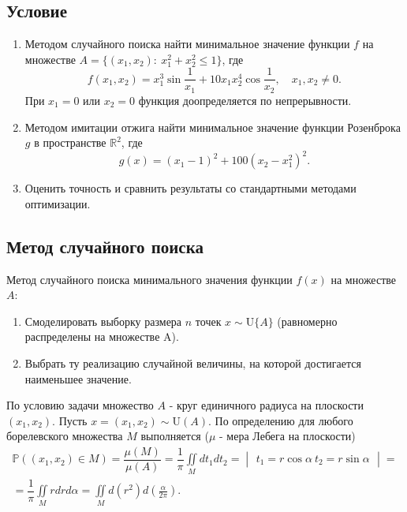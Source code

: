 \documentclass[11pt]{report}
\begin{document}
\subsection{Условие}

\begin{enumerate}
\item Методом случайного поиска найти минимальное значение функции $f$ на множестве $A = \{(x_1,x_2):~x_1^2+x_2^2\leqslant 1\}$, где
\begin{equation}\label{func7}
f(x_1,x_2) = x_1^3\sin\frac{1}{x_1} + 10x_1x_2^4\cos\frac{1}{x_2},\quad x_1,x_2\neq0.
\end{equation}
При $x_1=0$ или $x_2=0$ функция доопределяется по непрерывности.

\item Методом имитации отжига найти минимальное значение функции Розенброка $g$ в пространстве $\mathbb{R}^2$, где
$$
g(x) = (x_1-1)^2 + 100(x_2-x_1^2)^2.
$$

\item Оценить точность и сравнить результаты со стандартными методами оптимизации.
\end{enumerate}

\subsection{Метод случайного поиска}

Метод случайного поиска минимального значения функции $f(x)$ на множестве $A$:
\begin{enumerate}
\item Смоделировать выборку размера $n$ точек $x\sim\mathrm{U}\{A\}$ (равномерно распределены на множестве A).
\item Выбрать ту реализацию случайной величины, на которой достигается наименьшее значение.
\end{enumerate}

По условию задачи множество $A$ - круг единичного радиуса на плоскости $(x_1,x_2)$. Пусть $x=(x_1,x_2)\sim\mathrm{U}(A)$. По определению для любого борелевского множества $M$ выполняется ($\mu$ - мера Лебега на плоскости)
\begin{multline*}
\mathbb{P}\left( (x_1,x_2)\in M \right) = \dfrac{\mu (M)}{\mu (A)} = \dfrac{1}{\pi}\iint\limits_M dt_1dt_2 = \begin{vmatrix}
t_1 = r\cos\alpha \
t_2 = r\sin\alpha
\end{vmatrix} = \\
= \dfrac{1}{\pi}\iint\limits_M rdrd\alpha = \iint\limits_M d(r^2)d\left(\frac{\alpha}{2\pi}\right).
\end{multline*}
\end{document}
